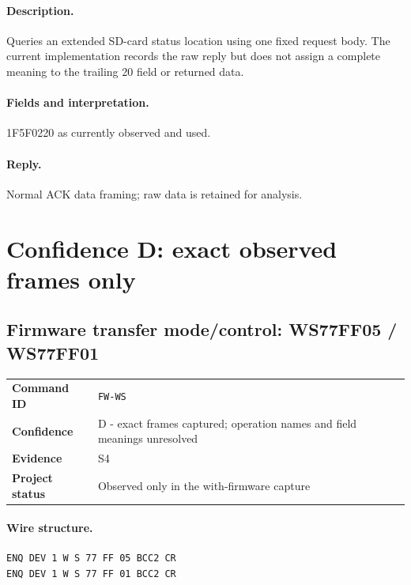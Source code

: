 \documentclass[10pt,letterpaper]{article}
\begin{document}
\paragraph{Description.} Queries an extended SD-card status location using one fixed request body. The current implementation records the raw reply but does not assign a complete meaning to the trailing 20 field or returned data.
\paragraph{Fields and interpretation.}
\begin{description}[style=nextline,leftmargin=3.2cm,labelwidth=3.0cm,font=\normalfont\bfseries]
\item[Fixed payload] 1F5F0220 as currently observed and used.
\end{description}
\paragraph{Reply.} Normal ACK data framing; raw data is retained for analysis.

\section{Confidence D: exact observed frames only}

\subsection{Firmware transfer mode/control: WS77FF05 / WS77FF01}
\begin{tabularx}{\textwidth}{@{}>{\bfseries}p{2.8cm}X@{}}
Command ID & \texttt{FW-WS} \\
Confidence & D - exact frames captured; operation names and field meanings unresolved \\
Evidence & S4 \\
Project status & Observed only in the with-firmware capture \\
\end{tabularx}
\vspace{0.35em}
\paragraph{Wire structure.}
\begin{Verbatim}[breaklines=true,breakanywhere=true,fontsize=\small]
ENQ DEV 1 W S 77 FF 05 BCC2 CR
ENQ DEV 1 W S 77 FF 01 BCC2 CR
\end{Verbatim}
\end{document}
